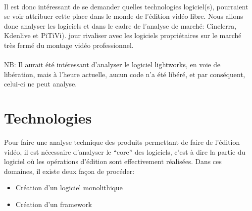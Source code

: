 \paragraph{}

Il est donc intéressant de se demander quelles technologies %
logiciel(s), pourraient se voir attribuer cette place dans le monde
de l'édition vidéo libre. Nous allons donc analyser les logiciels
et %
dans le cadre de l'analyse de marché: Cinelerra, Kdenlive et PiTiVi).
jour rivaliser avec les logiciels propriétaires sur le marché très
fermé du montage vidéo professionnel.

\paragraph{}

NB: Il aurait été intéressant d'analyser le logiciel lightworks,
en voie de libération, mais à l'heure actuelle, aucun code n'a été
libéré, et par conséquent, celui-ci ne peut %
analyse.

\newpage

\section{Technologies}

\paragraph{}

Pour faire une analyse technique des produits permettant de faire
de l'édition vidéo, il est nécessaire d'analyser le ``core'' des
logiciels, c'est à dire la partie du logiciel où les opérations
d'édition sont effectivement réalisées. Dans ces domaines, il existe
deux façon de procéder:

\begin{itemize} \setlength{\itemsep}{2mm}

  \item{Création d'un logiciel monolithique}

  \item{Création d'un framework  }

\end{itemize}

